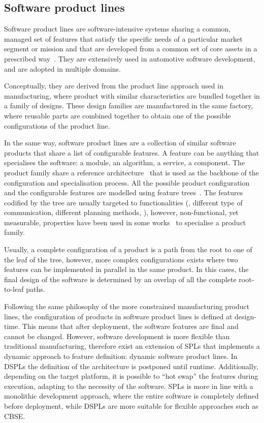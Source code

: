 \subsection{Software product lines}
Software product lines are software-intensive systems sharing a common, managed set of features that satisfy the specific needs of a particular market segment or mission and that are developed from a common set of core assets in a prescribed way~\cite{northrop2002sei}. They are extensively used in automotive software development, and are adopted in multiple domains.

Conceptually, they are derived from the product line approach used in manufacturing, where product with similar characteristics are bundled together in a family of designs. These design families are manufactured in the same factory, where reusable parts are combined together to obtain one of the possible configurations of the product line.

In the same way, software product lines are a collection of similar software products that share a list of configurable features. A feature can be anything that specialises the software: a module, an algorithm, a service, a component. The product family share a reference architecture~\cite{nakagawa2011reference} that is used as the backbone of the configuration and specialisation process. All the possible product configuration and the configurable features are modelled using feature trees~\cite{mendonca2009splot, eriksson2009managing}. The features codified by the tree are usually targeted to functionalities (\eg, different type of communication, different planning methods, \etc), however, non-functional, yet measurable, properties have been used in some works~\cite{benavides2005automated} to specialise a product family.

Usually, a complete configuration of a product is a path from the root to one of the leaf of the tree, however, more complex configurations exists where two features can be implemented in parallel in the same product. In this cases, the final design of the software is determined by an overlap of all the complete root-to-leaf paths.

Following the same philosophy of the more constrained manufacturing product lines, the configuration of products in software product lines is defined at design-time. This means that after deployment, the software features are final and cannot be changed. However, software development is more flexible than traditional manufacturing, therefore exist an extension of SPLs that implements a dynamic approach to feature definition: dynamic software product lines. In DSPLs the definition of the architecture is postponed until runtime. Additionally, depending on the target platform, it is possible to ``hot swap'' the features during execution, adapting to the necessity of the software. SPLs is more in line with a monolithic development approach, where the entire software is completely defined before deployment, while DSPLs are more suitable for flexible approaches such as CBSE.

